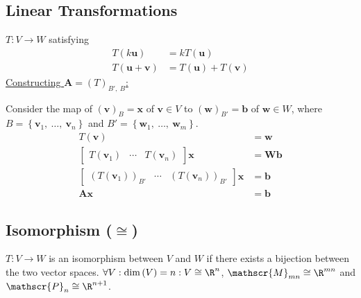 \documentclass{article}
\begin{document}
\begin{multicols*}{3}
    \subsection{Linear Transformations}
    \(T:V \to W\) satisfying
    \begin{align*}
        T\left( k\symbf{u} \right)            & = k T\left( \symbf{u} \right)                           \\
        T\left( \symbf{u} + \symbf{v} \right) & = T\left( \symbf{u} \right) + T\left( \symbf{v} \right)
    \end{align*}
    \underline{Constructing \(\symbf{A} = \left( T \right)_{B',\: B}\):}

    Consider the map of \(\left( \symbf{v} \right)_B = \symbf{x}\) of
    \(\symbf{v} \in V\) to \(\left( \symbf{w} \right)_{B'} =
    \symbf{b}\) of \(\symbf{w} \in W\), where \(B = \left\{
    \symbf{v}_1,\: \dots,\: \symbf{v}_n \right\}\) and \(B' = \left\{
    \symbf{w}_1,\: \dots,\: \symbf{w}_m \right\}\).
    \begin{align*}
        T\left( \symbf{v} \right) & = \symbf{w}           \\
        \begin{bmatrix}
            T\left( \symbf{v}_1 \right) & \cdots & T\left( \symbf{v}_n \right)
        \end{bmatrix}
        \symbf{x}                 & = \symbf{W} \symbf{b} \\
        \begin{bmatrix}
            \left( T\left( \symbf{v}_1 \right) \right)_{B'} & \cdots & \left( T\left( \symbf{v}_n \right) \right)_{B'}
        \end{bmatrix}
        \symbf{x}                 & = \symbf{b}           \\
        \symbf{A} \symbf{x}       & = \symbf{b}
    \end{align*}
    \subsection{Isomorphism (\texorpdfstring{\(\cong\)}{≅})}
    \(T : V \to W\) is an isomorphism between \(V\) and \(W\) if there exists a bijection between the two vector spaces.
    \(\forall V : \dim{\left( V \right)} = n : V \cong \R^n\), \(\mathscr{M}_{mn} \cong \R^{mn}\)
    and \(\mathscr{P}_n \cong \R^{n + 1}\).

\end{multicols*}
\end{document}
